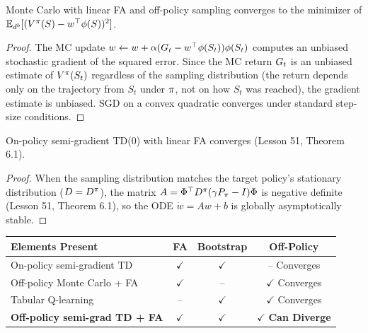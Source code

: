 \documentclass[11pt,a4paper]{article}
\begin{document}
\begin{proposition}
\label{prop:no_bootstrap}
Monte Carlo with linear FA and off-policy sampling converges to the
minimizer of $\mathbb{E}_{d^b}[(V^\pi(S) - w^\top\phi(S))^2]$.
\end{proposition}

\begin{proof}
The MC update $w \leftarrow w + \alpha(G_t - w^\top\phi(S_t))
\phi(S_t)$ computes an unbiased stochastic gradient of the squared
error. Since the MC return $G_t$ is an unbiased estimate of
$V^\pi(S_t)$ regardless of the sampling distribution
(the return depends only on the trajectory from $S_t$ under
$\pi$, not on how $S_t$ was reached), the gradient estimate is
unbiased. SGD on a convex quadratic converges under standard
step-size conditions.
\end{proof}

\begin{proposition}
\label{prop:no_offpolicy}
On-policy semi-gradient TD(0) with linear FA converges
(Lesson 51, Theorem 6.1).
\end{proposition}

\begin{proof}
When the sampling distribution matches the target policy's stationary
distribution ($D = D^\pi$), the matrix
$A = \Phi^\top D^\pi(\gamma P_\pi - I)\Phi$ is negative
definite (Lesson 51, Theorem 6.1), so the ODE
$\dot{w} = Aw + b$ is globally asymptotically stable.
\end{proof}

\begin{keyresult}[title={Summary: The Deadly Triad}]
\begin{center}
\begin{tabular}{lccc}
\toprule
\textbf{Elements Present} & \textbf{FA} & \textbf{Bootstrap}
  & \textbf{Off-Policy} \\
\midrule
On-policy semi-gradient TD & $\checkmark$ & $\checkmark$ & --
  \quad Converges \\
Off-policy Monte Carlo + FA & $\checkmark$ & -- & $\checkmark$
  \quad Converges \\
Tabular Q-learning & -- & $\checkmark$ & $\checkmark$
  \quad Converges \\
\textbf{Off-policy semi-grad TD + FA}
  & $\checkmark$ & $\checkmark$ & $\checkmark$
  \quad \textbf{Can Diverge} \\
\bottomrule
\end{tabular}
\end{center}
\end{keyresult}
\end{document}
